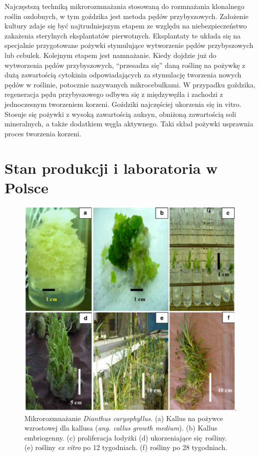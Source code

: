 \documentclass[two column, twoside, a4paper]{article}
\begin{document}
Najczęstszą techniką mikrorozmnażania stosowaną do rozmnażania klonalnego roślin ozdobnych, w tym goździka jest metoda pędów przybyszowych. Założenie kultury zdaje się być najtrudniejszym etapem ze względu na niebezpieczeństwo zakażenia sterylnych eksplantatów pierwotnych. Eksplantaty te układa się na specjalnie przygotowane pożywki stymulujące wytworzenie pędów przybyszowych lub cebulek. Kolejnym etapem jest namnażanie. Kiedy dojdzie już do wytworzenia pędów przybyszowych, “przesadza się” daną roślinę na pożywkę z dużą zawartością cytokinin odpowiadających za stymulację tworzenia nowych pędów w roślinie, potocznie nazywanych mikrocebulkami. W przypadku goździka, regeneracja pędu przybyszowego odbywa się z międzywęźla i zachodzi z jednoczesnym tworzeniem korzeni.  Goździki najczęściej ukorzenia się in vitro. Stosuje się pożywki z wysoką zawartością auksyn, obniżoną zawartością soli mineralnych, a także dodatkiem węgla aktywnego. Taki skład pożywki usprawnia proces tworzenia korzeni.

\section{Stan produkcji i laboratoria w Polsce}

\begin{figure}[tp]
	\begin{tcolorbox}
		\centering
		\includegraphics[width=\textwidth]{./figure1.png}
		\caption{Mikrorozmnażanie \textit{Dianthus caryophyllus}. (a) Kallus na pożywce wzrostowej dla kallusa (\textit{ang. callus growth medium}). (b) Kallus embriogenny. (c) proliferacja łodyżki (d) ukorzeniające się rośliny. (e) rośliny \textit{ex vitro} po 12 tygodniach. (f) rośliny po 28 tygodniach.}
	\end{tcolorbox}
\end{figure}
\end{document}
